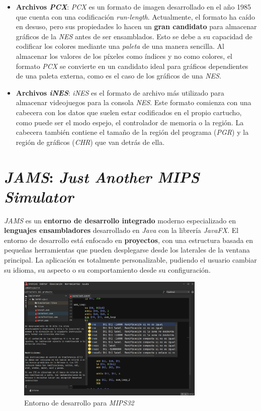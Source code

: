 \begin{itemize}
    \item \textbf{Archivos \textit{PCX}}: \textit{PCX} es un formato de imagen desarrollado
    en el año 1985 que cuenta con una codificación \textit{run-length}.
    Actualmente, el formato ha caído en desuso, pero sus propiedades
    lo hacen un \textbf{gran candidato} para almacenar gráficos
    de la \textit{NES} antes de ser ensamblados.
    Esto se debe a su capacidad de codificar los colores mediante
    una \textit{paleta} de una manera sencilla.
    Al almacenar los valores de los píxeles como índices y no
    como colores, el formato \textit{PCX} se convierte en un
    candidato ideal para gráficos dependientes de una paleta
    externa, como es el caso de los gráficos de una \textit{NES}.
    \item \textbf{Archivos \textit{iNES}}: \textit{iNES}
    es el formato de archivo más utilizado
    para almacenar videojuegos para la consola \textit{NES}.
    Este formato comienza con una cabecera con los datos que suelen
    estar codificados en el propio cartucho, como puede ser el modo
    espejo, el controlador de memoria o la región.
    La cabecera también contiene el tamaño de la región del
    programa (\textit{PGR}) y la región de gráficos (\textit{CHR})
    que van detrás de ella.
\end{itemize}


\section{\textit{JAMS}: \textit{Just Another MIPS Simulator}}
\label{sec:jams-just-another-mips-simulator}

\textit{JAMS}\cite{JAMS} es un \textbf{entorno de desarrollo integrado} moderno especializado
en \textbf{lenguajes ensambladores} desarrollado en \textit{Java}\cite{JAVA}
con la librería \textit{JavaFX}\cite{JAVAFX}.
El entorno de desarrollo está enfocado en \textbf{proyectos},
con una estructura basada en pequeñas herramientas que pueden
desplegarse desde los laterales de la ventana principal.
La aplicación es totalmente personalizable, pudiendo el usuario
cambiar su idioma, su aspecto o su comportamiento desde
su configuración.

\begin{figure}[h]
    \centering
    \includegraphics[width=0.8\textwidth]{images/antecedentes/jams-documentation}
    \caption{Entorno de desarrollo para \textit{MIPS32}}
    \label{fig:jams-documentation}
\end{figure}

